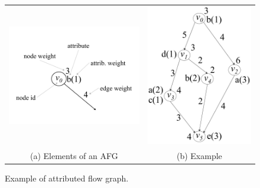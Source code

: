 \begin{figure}[htp]
\centering
\begin{tabular}{cc}
  \includegraphics[scale=0.18]{figures/attributed_flow_graph_descpr.pdf} &
  \includegraphics[scale=0.18]{figures/attributed_flow_graph3.pdf}\\
  (a) Elements of an AFG & (b) Example
\end{tabular}
    \caption{Example of attributed flow graph.}
    \label{fig:AFG}  
\end{figure}


